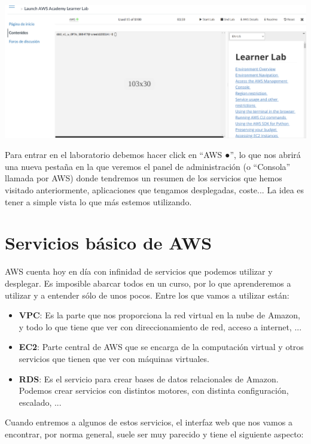 \begin{center}
	\includegraphics[frame, width=0.9\linewidth]{img/aws/launcher-started.png}
\end{center}

Para entrar en el laboratorio debemos hacer click en “{AWS \color{green}●}”, lo que nos abrirá una nueva pestaña en la que veremos el panel de administración (o “Consola” llamada por AWS) donde tendremos un resumen de los servicios que hemos visitado anteriormente, aplicaciones que tengamos desplegadas, coste... La idea es tener a simple vista lo que más estemos utilizando.


\chapter{Servicios básico de AWS}

AWS cuenta hoy en día con infinidad de servicios que podemos utilizar y desplegar. Es imposible abarcar todos en un curso, por lo que aprenderemos a utilizar y a entender sólo de unos pocos. Entre los que vamos a utilizar están:

\begin{itemize}
	\item \textbf{VPC}: Es la parte que nos proporciona la red virtual en la nube de Amazon, y todo lo que tiene que ver con direccionamiento de red, acceso a internet, ... 
	\item \textbf{EC2}: Parte central de AWS que se encarga de la computación virtual y otros servicios que tienen que ver con máquinas virtuales.
	\item \textbf{RDS}: Es el servicio para crear bases de datos relacionales de Amazon. Podemos crear servicios con distintos motores, con distinta configuración, escalado, ...
\end{itemize}

Cuando entremos a algunos de estos servicios, el interfaz web que nos vamos a encontrar, por norma general, suele ser muy parecido y tiene el siguiente aspecto:

